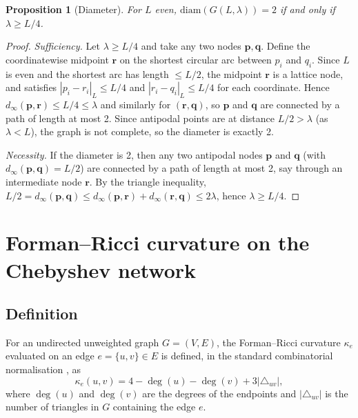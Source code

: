\documentclass[aps,pre,onecolumn,10pt,groupedaddress,amsmath,amssymb,floatfix]{revtex4-2}
\newtheorem{proposition}{Proposition}
\begin{document}
\begin{proposition}[Diameter]
\label{prop:diameter}
For $L$ even, $\mathrm{diam}(G(L, \lambda)) = 2$ if and only if $\lambda \ge L/4$.
\end{proposition}
\begin{proof}
\emph{Sufficiency.} Let $\lambda \ge L/4$ and take any two nodes $\mathbf{p}, \mathbf{q}$. Define the coordinatewise midpoint $\mathbf{r}$ on the shortest circular arc between $p_i$ and $q_i$. Since $L$ is even and the shortest arc has length $\le L/2$, the midpoint $\mathbf{r}$ is a lattice node, and satisfies $|p_i - r_i|_L \le L/4$ and $|r_i - q_i|_L \le L/4$ for each coordinate. Hence $d_\infty(\mathbf{p}, \mathbf{r}) \le L/4 \le \lambda$ and similarly for $(\mathbf{r}, \mathbf{q})$, so $\mathbf{p}$ and $\mathbf{q}$ are connected by a path of length at most 2. Since antipodal points are at distance $L/2 > \lambda$ (as $\lambda < L$), the graph is not complete, so the diameter is exactly 2.

\emph{Necessity.} If the diameter is 2, then any two antipodal nodes $\mathbf{p}$ and $\mathbf{q}$ (with $d_\infty(\mathbf{p}, \mathbf{q}) = L/2$) are connected by a path of length at most 2, say through an intermediate node $\mathbf{r}$. By the triangle inequality, $L/2 = d_\infty(\mathbf{p}, \mathbf{q}) \le d_\infty(\mathbf{p}, \mathbf{r}) + d_\infty(\mathbf{r}, \mathbf{q}) \le 2\lambda$, hence $\lambda \ge L/4$.
\end{proof}

\section{Forman--Ricci curvature on the Chebyshev network}
\label{sec:forman}

\subsection{Definition}

For an undirected unweighted graph $G = (V, E)$, the Forman--Ricci curvature $\kappa_e$ evaluated on an edge $e = \{u, v\} \in E$ is defined, in the standard combinatorial normalisation \cite{forman2003bochner, weber2017forman}, as
\begin{equation}
\kappa_e(u, v) = 4 - \deg(u) - \deg(v) + 3|\triangle_{uv}|,
\label{eq:forman}
\end{equation}
where $\deg(u)$ and $\deg(v)$ are the degrees of the endpoints and $|\triangle_{uv}|$ is the number of triangles in $G$ containing the edge $e$.
\end{document}
